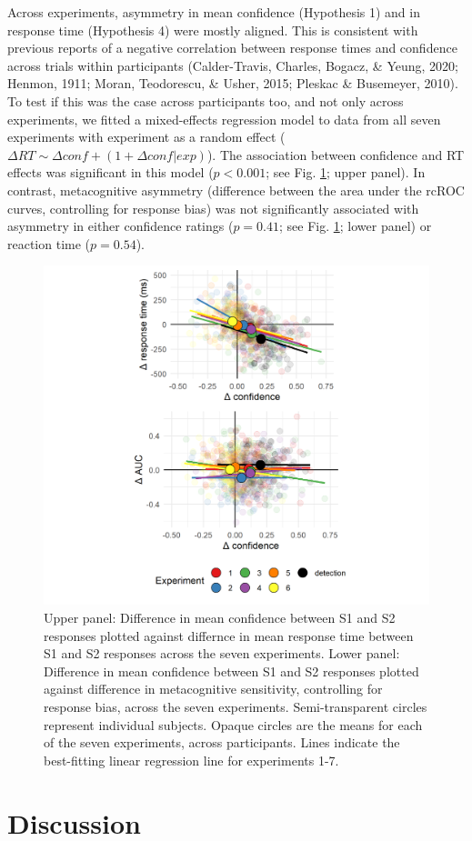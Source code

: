 \documentclass[12pt,twoside]{reedthesis}
\begin{document}
Across experiments, asymmetry in mean confidence (Hypothesis 1) and in response time (Hypothesis 4) were mostly aligned. This is consistent with previous reports of a negative correlation between response times and confidence across trials within participants (Calder-Travis, Charles, Bogacz, \& Yeung, 2020; Henmon, 1911; Moran, Teodorescu, \& Usher, 2015; Pleskac \& Busemeyer, 2010). To test if this was the case across participants too, and not only across experiments, we fitted a mixed-effects regression model to data from all seven experiments with experiment as a random effect (\(\Delta RT \sim \Delta conf+(1+\Delta conf|exp)\)). The association between confidence and RT effects was significant in this model (\(p<0.001\); see Fig. \ref{fig:asymmetry-correlations-fig}; upper panel). In contrast, metacognitive asymmetry (difference between the area under the rcROC curves, controlling for response bias) was not significantly associated with asymmetry in either confidence ratings (\(p=0.41\); see Fig. \ref{fig:asymmetry-correlations-fig}; lower panel) or reaction time (\(p=0.54\)).
\begin{figure}
\includegraphics[width=1\linewidth]{figure/asymmetry/correlations} \caption[Inter-subject correlations between reaction time, confidence, and metacognitive asymmetries]{Upper panel: Difference in mean confidence between S1 and S2 responses plotted against differnce in mean response time between S1 and S2 responses across the seven experiments. Lower panel: Difference in mean confidence between S1 and S2 responses plotted against difference in metacognitive sensitivity, controlling for response bias, across the seven experiments. Semi-transparent circles represent individual subjects. Opaque circles are the means for each of the seven experiments, across participants. Lines indicate the best-fitting linear regression line for experiments 1-7.}\label{fig:asymmetry-correlations-fig}
\end{figure}
\hypertarget{discussion-4}{%
\section{Discussion}\label{discussion-4}}
\end{document}
